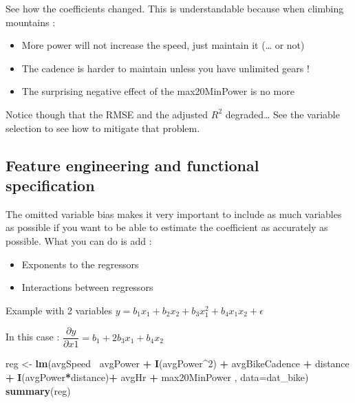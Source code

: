 \documentclass[
]{book}
\newenvironment{Shaded}{\begin{snugshade}}{\end{snugshade}}
\newcommand{\DataTypeTok}[1]{\textcolor[rgb]{0.13,0.29,0.53}{#1}}
\newcommand{\DecValTok}[1]{\textcolor[rgb]{0.00,0.00,0.81}{#1}}
\newcommand{\KeywordTok}[1]{\textcolor[rgb]{0.13,0.29,0.53}{\textbf{#1}}}
\newcommand{\NormalTok}[1]{#1}
\newcommand{\OperatorTok}[1]{\textcolor[rgb]{0.81,0.36,0.00}{\textbf{#1}}}
\newcommand{\StringTok}[1]{\textcolor[rgb]{0.31,0.60,0.02}{#1}}
\providecommand{\tightlist}{%
  \setlength{\itemsep}{0pt}\setlength{\parskip}{0pt}}
\begin{document}
See how the coefficients changed. This is understandable because when climbing mountains :

\begin{itemize}
\tightlist
\item
  More power will not increase the speed, just maintain it (\ldots{} or not)
\item
  The cadence is harder to maintain unless you have unlimited gears !
\item
  The surprising negative effect of the max20MinPower is no more
\end{itemize}

Notice though that the RMSE and the adjusted \(R^2\) degraded\ldots{} See the variable selection to see how to mitigate that problem.

\hypertarget{feature-engineering-and-functional-specification}{%
\subsection{Feature engineering and functional specification}\label{feature-engineering-and-functional-specification}}

The omitted variable bias makes it very important to include as much variables as possible if you want to be able to estimate the coefficient as accurately as possible. What you can do is add :

\begin{itemize}
\tightlist
\item
  Exponents to the regressors
\item
  Interactions between regressors
\end{itemize}

Example with 2 variables \(y=b_1x_1 + b_2x_2 + b_3x_1^2 + b_4x_1x_2 + \epsilon\)

In this case : \(\dfrac{\partial y}{\partial x1} = b_1+2b_3x_1+b_4x_2\)

\begin{Shaded}
\begin{Highlighting}[]
\NormalTok{reg <-}\StringTok{ }\KeywordTok{lm}\NormalTok{(avgSpeed}\OperatorTok{~}\StringTok{ }\NormalTok{avgPower }\OperatorTok{+}\StringTok{ }\KeywordTok{I}\NormalTok{(avgPower}\OperatorTok{^}\DecValTok{2}\NormalTok{) }\OperatorTok{+}\StringTok{ }\NormalTok{avgBikeCadence }\OperatorTok{+}\StringTok{ }
\StringTok{             }\NormalTok{distance }\OperatorTok{+}\StringTok{ }\KeywordTok{I}\NormalTok{(avgPower}\OperatorTok{*}\NormalTok{distance)}\OperatorTok{+}\StringTok{  }\NormalTok{avgHr }\OperatorTok{+}\StringTok{ }\NormalTok{max20MinPower , }\DataTypeTok{data=}\NormalTok{dat_bike)}
\KeywordTok{summary}\NormalTok{(reg)}
\end{Highlighting}
\end{Shaded}
\end{document}
